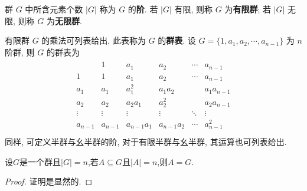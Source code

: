 \documentclass[../../main.tex]{subfiles}%
\begin{document}
\begin{definition}
群 \( G \) 中所含元素个数 \( |G| \) 称为 \( G \) 的\textbf{阶}. 若 \( |G| \) 有限, 则称 \( G \) 为\textbf{有限群}; 若 \( |G| \) 无限, 则称 \( G \) 为\textbf{无限群}.

有限群 \( G \) 的乘法可列表给出, 此表称为 \( G \) 的\textbf{群表}. 设 \( G = \{1, a_1, a_2, \cdots, a_{n-1}\} \) 为 \( n \) 阶群, 则 \( G \) 的群表为
\begin{align*}
\begin{array}{c|ccccc}
& 1 & a_1 & a_2 & \cdots & a_{n-1} \\
\hline
1 & 1 & a_1 & a_2 & \cdots & a_{n-1} \\
a_1 & a_1 & a_1^2 & a_1a_2 &  & a_1a_{n-1} \\
a_2 & a_2 & a_2a_1 & a_2^2 &  & a_2a_{n-1} \\
\vdots & \vdots & \vdots & \vdots & \ddots & \vdots \\
a_{n-1} & a_{n-1} & a_{n-1}a_1 & a_{n-1}a_2 & \cdots & a_{n-1}^2 \\
\end{array}
\end{align*}
同样, 可定义半群与幺半群的阶, 对于有限半群与幺半群, 其运算也可列表给出.
\end{definition}

\begin{proposition}
设$G$是一个群且$|G|=n$,若$A\subseteq G$且$|A|=n$,则$A=G.$
\end{proposition}
\begin{proof}

证明是显然的.

\end{proof}
\end{document}
